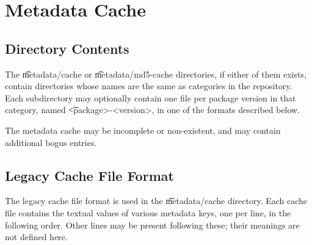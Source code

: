 \chapter{Metadata Cache}
\label{ch:metadata-cache}

\section{Directory Contents}

The \t{metadata/cache} or \t{metadata/md5-cache} directories, if either of them exists, contain
directories whose names are the same as categories in the repository. Each subdirectory may
optionally contain one file per package version in that category, named \t{<package>-<version>},
in one of the formats described below.

The metadata cache may be incomplete or non-existent, and may contain additional bogus entries.

\section{Legacy Cache File Format}
\label{sec:legacy-cache}

The legacy cache file format is used in the \t{metadata/cache} directory. Each cache file contains
the textual values of various metadata keys, one per line, in the following order. Other lines may
be present following these; their meanings are not defined here.

